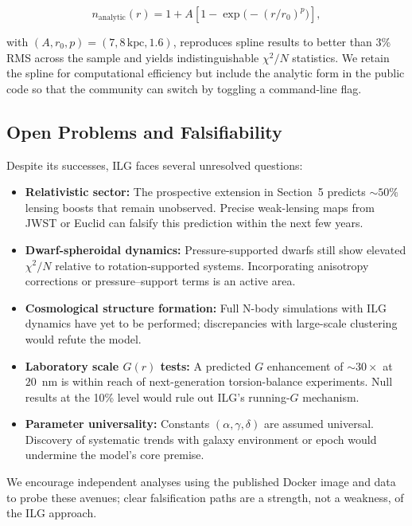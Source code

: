 \documentclass[12pt,a4paper]{article}
\begin{document}
\begin{equation}
n_\mathrm{analytic}(r) = 1 + A\left[1 - \exp\!\bigl(-(r/r_0)^p\bigr)\right],
\end{equation}

with $(A, r_0, p) = (7, 8\,\text{kpc}, 1.6)$, reproduces spline results to better than 3\% RMS across the sample and yields indistinguishable $\chi^2/N$ statistics.  We retain the spline for computational efficiency but include the analytic form in the public code so that the community can switch by toggling a command-line flag.

\subsection{Open Problems and Falsifiability}

Despite its successes, ILG faces several unresolved questions:

\begin{itemize}
  \item \textbf{Relativistic sector:} The prospective extension in Section~5 predicts $\sim 50\%$ lensing boosts that remain unobserved.  Precise weak-lensing maps from JWST or Euclid can falsify this prediction within the next few years.
  \item \textbf{Dwarf-spheroidal dynamics:} Pressure-supported dwarfs still show elevated $\chi^2/N$ relative to rotation-supported systems.  Incorporating anisotropy corrections or pressure–support terms is an active area.
  \item \textbf{Cosmological structure formation:} Full N-body simulations with ILG dynamics have yet to be performed; discrepancies with large-scale clustering would refute the model.
  \item \textbf{Laboratory scale $G(r)$ tests:} A predicted $G$ enhancement of $\sim 30\times$ at $20$~nm is within reach of next-generation torsion-balance experiments.  Null results at the 10\% level would rule out ILG's running-$G$ mechanism.
  \item \textbf{Parameter universality:} Constants $(\alpha, \gamma, \delta)$ are assumed universal.  Discovery of systematic trends with galaxy environment or epoch would undermine the model's core premise.
\end{itemize}

We encourage independent analyses using the published Docker image and data to probe these avenues; clear falsification paths are a strength, not a weakness, of the ILG approach.
\end{document}
